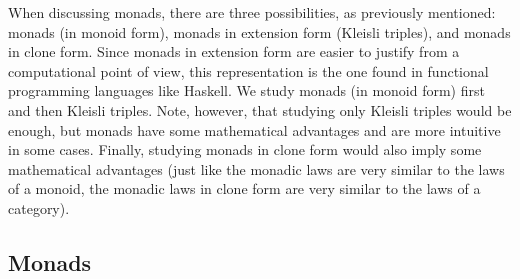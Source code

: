 When discussing monads, there are three possibilities, as previously
mentioned: monads (in monoid form), monads in extension form (Kleisli
triples), and monads in clone form. Since monads in extension form are
easier to justify from a computational point of view, this
representation is the one found in functional programming languages
like Haskell. We study monads (in monoid form) first and then Kleisli
triples. Note, however, that studying only Kleisli triples would be
enough, but monads have some mathematical advantages and are more
intuitive in some cases. Finally, studying monads in clone form would
also imply some mathematical advantages (just like the monadic laws
are very similar to the laws of a monoid, the monadic laws in clone
form are very similar to the laws of a category).

\subsection*{Monads}

